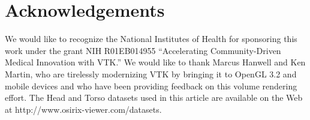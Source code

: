 \section{Acknowledgements}
We would like to recognize the National Institutes of Health for sponsoring this work under the grant NIH R01EB014955 “Accelerating Community-Driven Medical Innovation with VTK.” We would like to thank Marcus Hanwell and Ken Martin, who are tirelessly modernizing VTK by bringing it to OpenGL 3.2 and mobile devices and who have been providing feedback on this volume rendering effort.
The Head and Torso datasets used in this article are available on the Web at http://www.osirix-viewer.com/datasets.
